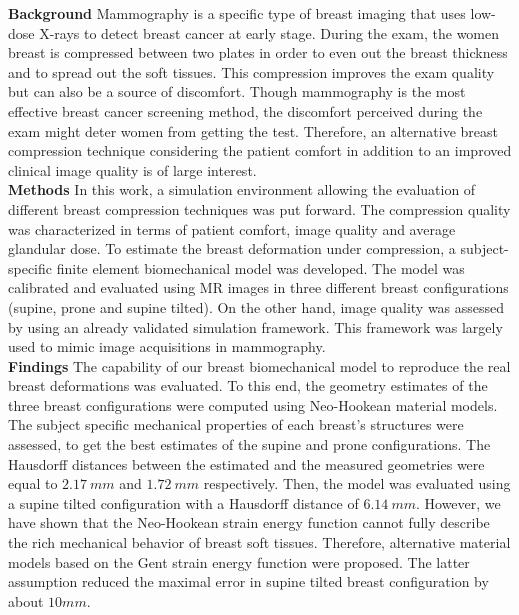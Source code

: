 \noindent
\textbf{Background} Mammography is a specific type of breast imaging that uses low-dose X-rays to detect breast cancer at early stage. During the exam, the women breast is compressed between two plates in order to even out the breast thickness and to spread out the soft tissues. This compression improves the exam quality but can also be a source of discomfort. Though mammography is the most effective breast cancer screening method, the discomfort perceived during the exam might deter women from getting the test. Therefore, an alternative breast compression technique considering the patient comfort in addition to an improved clinical image quality is of large interest. \\

\noindent
\textbf{Methods}
In this work, a simulation environment allowing the evaluation of different breast compression techniques was put forward. The compression quality was characterized in terms of patient comfort, image quality and average glandular dose. To estimate the breast deformation under compression, a subject-specific finite element biomechanical model was developed. The model was calibrated and evaluated using MR images in three different breast configurations (supine, prone and supine tilted). On the other hand, image quality was assessed by using an already validated simulation framework. This framework was largely used to mimic image acquisitions in mammography. \\


\noindent
\textbf{Findings} The capability of our	 breast biomechanical model to reproduce the real breast deformations was evaluated. To this end, the geometry estimates of the three breast configurations were computed using Neo-Hookean material models. The subject specific mechanical properties of each breast's structures were assessed, to get the best estimates of the supine and prone configurations. The Hausdorff distances between the estimated and the measured geometries were equal to $2.17 \ mm$ and $1.72 \ mm$  respectively. Then, the model was evaluated using a supine tilted configuration with a Hausdorff distance of $6.14\ mm$. However, we have shown that the Neo-Hookean strain energy function cannot fully describe the rich mechanical behavior of breast soft tissues. Therefore, alternative material models based on the Gent strain energy function were proposed. The latter assumption reduced the maximal error in supine tilted breast configuration by about $10mm$. \\


